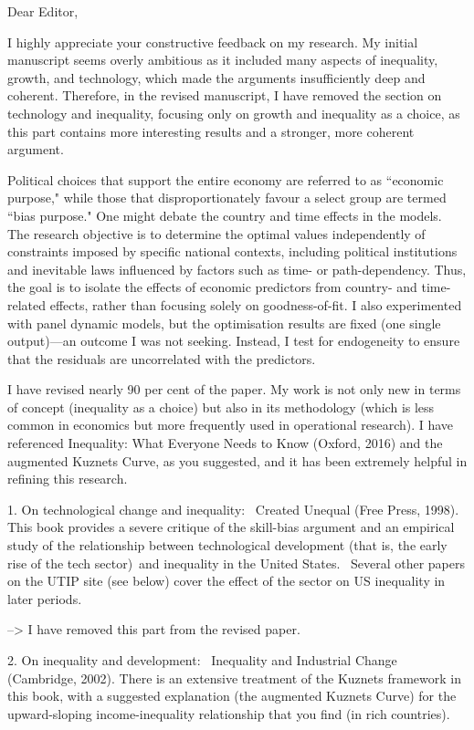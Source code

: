 
Dear Editor,

I highly appreciate your constructive feedback on my research. My initial manuscript seems overly ambitious as it included many aspects of inequality, growth, and technology, which made the arguments insufficiently deep and coherent. Therefore, in the revised manuscript, I have removed the section on technology and inequality, focusing only on growth and inequality as a choice, as this part contains more interesting results and a stronger, more coherent argument.

Political choices that support the entire economy are referred to as ``economic purpose," while those that disproportionately favour a select group are termed ``bias purpose." One might debate the country and time effects in the models. The research objective is to determine the optimal values independently of constraints imposed by specific national contexts, including political institutions and inevitable laws influenced by factors such as time- or path-dependency. Thus, the goal is to isolate the effects of economic predictors from country- and time-related effects, rather than focusing solely on goodness-of-fit. I also experimented with panel dynamic models, but the optimisation results are fixed (one single output)—an outcome I was not seeking. Instead, I test for endogeneity to ensure that the residuals are uncorrelated with the predictors. 

I have revised nearly 90 per cent of the paper. My work is not only new in terms of concept (inequality as a choice) but also in its methodology (which is less common in economics but more frequently used in operational research). I have referenced Inequality: What Everyone Needs to Know (Oxford, 2016) and the augmented Kuznets Curve, as you suggested, and it has been extremely helpful in refining this research.


1. On technological change and inequality:  Created Unequal (Free Press, 1998). This book provides a severe critique of the skill-bias argument and an empirical study of the relationship between technological development (that is, the early rise of the tech sector) and inequality in the United States.  Several other papers on the UTIP site (see below) cover the effect of the sector on US inequality in later periods.

--> I have removed this part from the revised paper.


2. On inequality and development:  Inequality and Industrial Change (Cambridge, 2002). There is an extensive treatment of the Kuznets framework in this book, with a suggested explanation (the augmented Kuznets Curve) for the upward-sloping income-inequality relationship that you find (in rich countries). 

